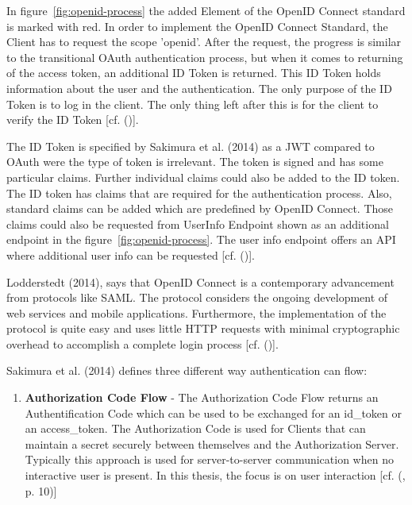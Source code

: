 {{		
		In figure~\ref{fig:openid-process} the added Element of the OpenID Connect standard is marked with red. In order to implement the OpenID Connect Standard, the Client has to request the scope 'openid'. After the request, the progress is similar to the transitional OAuth authentication process, but when it comes to returning of the access token, an additional ID Token is returned. This ID Token holds information about the user and the authentication. The only purpose of the ID Token is to log in the client. The only thing left after this is for the client to verify the ID Token [cf. (\cite{Lodderstedt:2014:OpenID})]. 
		
		The ID Token is specified by Sakimura et al. (2014) as a JWT compared to OAuth were the type of token is irrelevant. The token is signed and has some particular claims. Further individual claims could also be added to the ID token. The ID token has claims that are required for the authentication process. Also, standard claims can be added which are predefined by OpenID Connect. Those claims could also be requested from UserInfo Endpoint shown as an additional endpoint in the figure~\ref{fig:openid-process}. The user info endpoint offers an API where additional user info can be requested [cf. (\cite{Sakimura:2014:OpenIDConnect})].
		
		Lodderstedt (2014), says that OpenID Connect is a contemporary advancement from protocols like SAML. The protocol considers the ongoing development of web services and mobile applications. Furthermore, the implementation of the protocol is quite easy and uses little HTTP requests with minimal cryptographic overhead to accomplish a complete login process [cf. (\cite{Lodderstedt:2014:OpenID})]. 
		
		
		
		
		
		
		Sakimura et al. (2014) defines three different way authentication can flow:
		
		
		\begin{enumerate}
			\item \textbf{Authorization Code Flow}  - The Authorization Code Flow returns an Authentification Code which can be used to be exchanged for an id\_token or an access\_token. The Authorization Code is used for Clients that can maintain a secret securely between themselves and the Authorization Server. Typically this approach is used for server-to-server communication when no interactive user is present. In this thesis, the focus is on user interaction [cf. (\cite{Sakimura:2014:OpenIDConnect}, p. 10)]
			

\end{enumerate}}}
